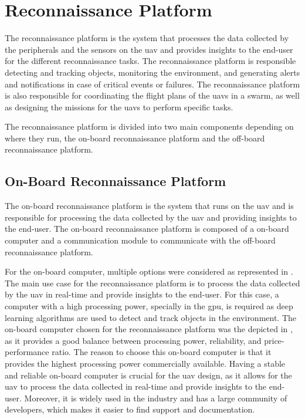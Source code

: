 \section{Reconnaissance Platform}\label{sec:design_reconnaissance_platform}

The reconnaissance platform is the system that processes the data collected by the peripherals and the sensors on the \gls{uav} and provides insights to the end-user for the different reconnaissance tasks. The reconnaissance platform is responsible detecting and tracking objects, monitoring the environment, and generating alerts and notifications in case of critical events or failures. The reconnaissance platform is also responsible for coordinating the flight plans of the \glspl{uav} in a swarm, as well as designing the missions for the \glspl{uav} to perform specific tasks.

The reconnaissance platform is divided into two main components depending on where they run, the on-board reconnaissance platform and the off-board reconnaissance platform.

\subsection{On-Board Reconnaissance Platform}\label{subsec:on-board_reconnaissance_platform}

The on-board reconnaissance platform is the system that runs on the \gls{uav} and is responsible for processing the data collected by the \gls{uav} and providing insights to the end-user. The on-board reconnaissance platform is composed of a on-board computer and a communication module to communicate with the off-board reconnaissance platform.

For the on-board computer, multiple options were considered as represented in . The main use case for the reconnaissance platform is to process the data collected by the \gls{uav} in real-time and provide insights to the end-user. For this case, a computer with a high processing power, specially in the \gls{gpu}, is required as deep learning algorithms are used to detect and track objects in the environment. The on-board computer chosen for the reconnaissance platform was the  depicted in , as it provides a good balance between processing power, reliability, and price-performance ratio. The reason to choose this on-board computer is that it provides the highest processing power commercially available. Having a stable and reliable on-board computer is crucial for the \gls{uav} design, as it allows for the \gls{uav} to process the data collected in real-time and provide insights to the end-user. Moreover, it is widely used in the industry and has a large community of developers, which makes it easier to find support and documentation.


